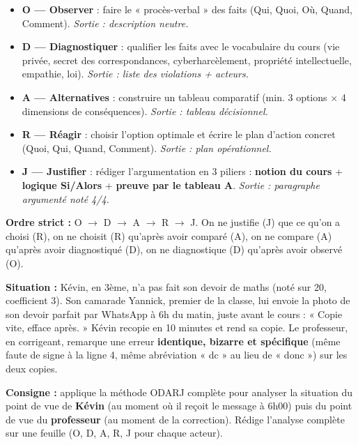 \documentclass[11pt]{article}
\begin{document}
\begin{aretenir}
\begin{itemize}
    \item \textbf{O — Observer} : faire le « procès-verbal » des faits (Qui, Quoi, Où, Quand, Comment). \textit{Sortie : description neutre.}
    \item \textbf{D — Diagnostiquer} : qualifier les faits avec le vocabulaire du cours (vie privée, secret des correspondances, cyberharcèlement, propriété intellectuelle, empathie, loi). \textit{Sortie : liste des violations + acteurs.}
    \item \textbf{A — Alternatives} : construire un tableau comparatif (min. 3 options $\times$ 4 dimensions de conséquences). \textit{Sortie : tableau décisionnel.}
    \item \textbf{R — Réagir} : choisir l'option optimale et écrire le plan d'action concret (Quoi, Qui, Quand, Comment). \textit{Sortie : plan opérationnel.}
    \item \textbf{J — Justifier} : rédiger l'argumentation en 3 piliers : \textbf{notion du cours} + \textbf{logique Si/Alors} + \textbf{preuve par le tableau A}. \textit{Sortie : paragraphe argumenté noté 4/4.}
\end{itemize}
\textbf{Ordre strict :} O $\rightarrow$ D $\rightarrow$ A $\rightarrow$ R $\rightarrow$ J. On ne justifie (J) que ce qu'on a choisi (R), on ne choisit (R) qu'après avoir comparé (A), on ne compare (A) qu'après avoir diagnostiqué (D), on ne diagnostique (D) qu'après avoir observé (O).
\end{aretenir}

\begin{exercice}
\textbf{Situation :} Kévin, en 3ème, n'a pas fait son devoir de maths (noté sur 20, coefficient 3). Son camarade Yannick, premier de la classe, lui envoie la photo de son devoir parfait par WhatsApp à 6h du matin, juste avant le cours : « Copie vite, efface après. » Kévin recopie en 10 minutes et rend sa copie. Le professeur, en corrigeant, remarque une erreur \textbf{identique, bizarre et spécifique} (même faute de signe à la ligne 4, même abréviation « dc » au lieu de « donc ») sur les deux copies.

\textbf{Consigne :} applique la méthode ODARJ complète pour analyser la situation du point de vue de \textbf{Kévin} (au moment où il reçoit le message à 6h00) puis du point de vue du \textbf{professeur} (au moment de la correction). Rédige l'analyse complète sur une feuille (O, D, A, R, J pour chaque acteur).
\end{exercice}
\end{document}
